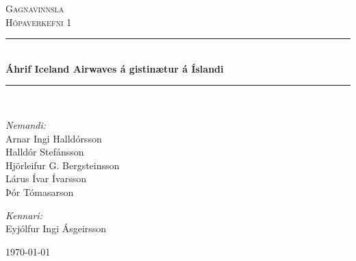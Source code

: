 \newcommand{\HRule}{\rule{\linewidth}{0.5mm}}

\begin{titlepage}

\begin{center}


\textsc{\LARGE Gagnavinnsla}\\[0.5cm]
\textsc{\Large Hópaverkefni 1}\\[0.6cm]

\HRule \\[0.4cm]
{ \Huge \bfseries Áhrif Iceland Airwaves á gistinætur á Íslandi}\\[0.2cm]

\HRule \\[1.5cm]


\begin{minipage}{0.49\textwidth}
\begin{flushleft} \large
\emph{Nemandi:}\\
Arnar Ingi Halldórsson\\
Halldór Stefánsson\\
Hjörleifur G. Bergsteinsson\\
Lárus Ívar Ívarsson\\
Þór Tómasarson
\end{flushleft}
\end{minipage}
\begin{minipage}{0.49\textwidth}
\begin{flushright} \large
\emph{Kennari:} \\
Eyjólfur Ingi Ásgeirsson
\end{flushright}
\end{minipage}

\vfill

{\large \today}



\end{center}

\end{titlepage}